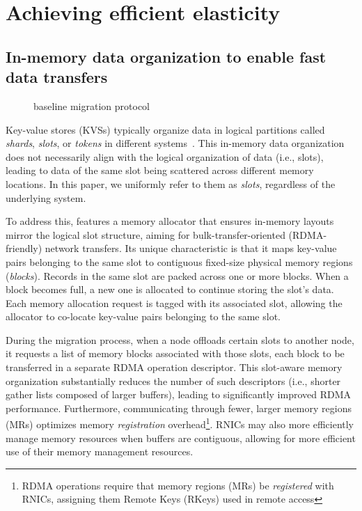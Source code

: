 
\section{Achieving efficient elasticity}
\label{sec:design}

\subsection{In-memory data organization to enable fast data transfers}
\label{sec:data_organization}

\begin{figure}[t]
	\centering
	
	\caption{\OurImplementation{} baseline migration protocol}
	\label{fig:migration_flow}
\end{figure}



Key-value stores (KVSs) typically organize data in logical partitions called {\em shards}, {\em slots}, or {\em tokens} in different systems~\cite{mongodb,redis-pure,cassandra-paper}.
This in-memory data organization does not necessarily align with the logical organization of data (i.e., slots), leading to data of the same slot being scattered across different memory locations.
In this paper, we uniformly refer to them as \emph{slots}, regardless of the underlying system.

To address this, \OurImplementation{} features a memory allocator that ensures in-memory layouts mirror the logical slot structure, aiming for bulk-transfer-oriented (RDMA-friendly) network transfers.
Its unique characteristic is that it maps key-value pairs belonging to the same slot to contiguous fixed-size physical memory regions ({\em blocks}).
Records in the same slot are packed across one or more blocks. When a block becomes full, a new one is allocated to continue storing the slot’s data.
Each memory allocation request is tagged with its associated slot, allowing the allocator to co-locate key-value pairs belonging to the same slot.

During the migration process, when a node offloads certain slots to another node, it requests a list of memory blocks associated with those slots, each block to be transferred in a separate RDMA operation descriptor.
This slot-aware memory organization substantially reduces the number of such descriptors (i.e., shorter gather lists composed of larger buffers), leading to significantly improved RDMA performance.
Furthermore, communicating through fewer, larger memory regions (MRs) optimizes memory \emph{registration} overhead\footnote{RDMA operations require that memory regions (MRs) be {\em registered} with RNICs, assigning them Remote Keys (RKeys) used in remote access}.
RNICs may also more efficiently manage memory resources when buffers are contiguous, allowing for more efficient use of their memory management resources.



